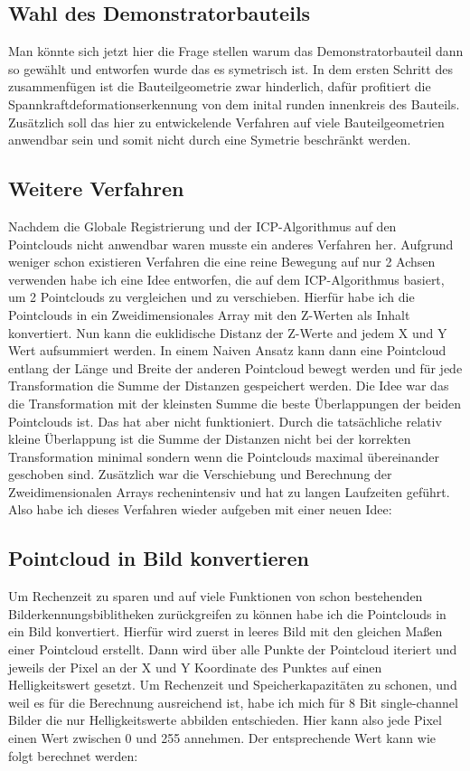 \documentclass[../main.tex]{subfiles}
\begin{document}
\subsection*{Wahl des Demonstratorbauteils}

Man könnte sich jetzt hier die Frage stellen warum das Demonstratorbauteil dann so gewählt 
und entworfen wurde das es symetrisch ist. In dem ersten Schritt des zusammenfügen ist 
die Bauteilgeometrie zwar hinderlich, dafür profitiert die 
Spannkraftdeformationserkennung von dem inital runden innenkreis des Bauteils.
Zusätzlich soll das hier zu entwickelende Verfahren auf viele Bauteilgeometrien 
anwendbar sein und somit nicht durch eine Symetrie beschränkt werden.

\subsection*{Weitere Verfahren}

Nachdem die Globale Registrierung und der ICP-Algorithmus auf den Pointclouds nicht
anwendbar waren musste ein anderes Verfahren her. Aufgrund weniger schon existieren 
Verfahren die eine reine Bewegung auf nur 2 Achsen verwenden habe ich eine Idee 
entworfen, die auf dem ICP-Algorithmus basiert, um 2 Pointclouds zu vergleichen 
und zu verschieben. Hierfür habe ich die Pointclouds in ein Zweidimensionales Array
mit den Z-Werten als Inhalt konvertiert. Nun kann die euklidische Distanz der Z-Werte
and jedem X und Y Wert aufsummiert werden. In einem Naiven Ansatz kann dann eine 
Pointcloud entlang der Länge und Breite der anderen Pointcloud bewegt werden und für 
jede Transformation die Summe der Distanzen gespeichert werden. Die Idee war das die 
Transformation mit der kleinsten Summe die beste Überlappungen der beiden Pointclouds 
ist. Das hat aber nicht funktioniert. Durch die tatsächliche relativ kleine Überlappung
ist die Summe der Distanzen nicht bei der korrekten Transformation minimal sondern 
wenn die Pointclouds maximal übereinander geschoben sind. Zusätzlich war die 
Verschiebung und Berechnung der Zweidimensionalen Arrays rechenintensiv und hat zu 
langen Laufzeiten geführt. Also habe ich dieses Verfahren wieder aufgeben mit einer neuen
Idee:

\subsection*{Pointcloud in Bild konvertieren}
Um Rechenzeit zu sparen und auf viele Funktionen von schon bestehenden 
Bilderkennungsbiblitheken zurückgreifen zu können habe ich die Pointclouds in ein
Bild konvertiert. Hierfür wird zuerst in leeres Bild mit den gleichen Maßen einer 
Pointcloud erstellt. Dann wird über alle Punkte der Pointcloud iteriert und jeweils
der Pixel an der X und Y Koordinate des Punktes auf einen Helligkeitswert gesetzt.
Um Rechenzeit und Speicherkapazitäten zu schonen, und weil es für die Berechnung 
ausreichend ist, habe ich mich für 8 Bit single-channel Bilder die nur Helligkeitswerte 
abbilden entschieden. Hier kann also jede Pixel einen Wert zwischen 0 und 255 annehmen.
Der entsprechende Wert kann wie folgt berechnet werden:
\end{document}
